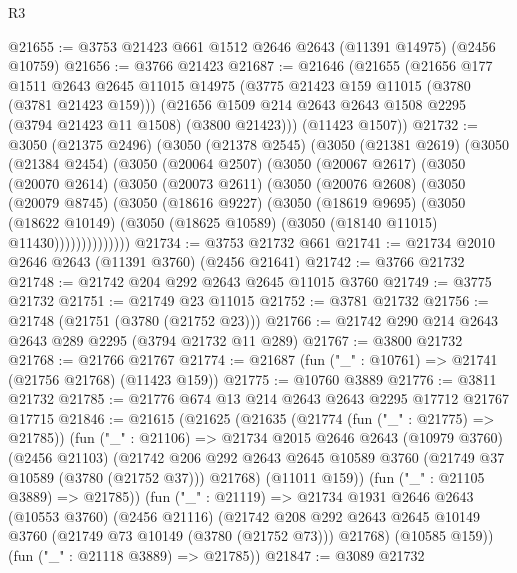 \begin{lexlean}{R3}
\begin{coremodule}
@21655 := @3753 @21423 @661 @1512 @2646 @2643 (@11391 @14975) (@2456 @10759)
@21656 := @3766 @21423
@21687 := @21646
    (@21655
      (@21656
        @177
        @1511
        @2643
        @2645
        @11015
        @14975
        (@3775 @21423 @159 @11015 (@3780 (@3781 @21423 @159)))
        (@21656 @1509 @214 @2643 @2643 @1508 @2295 (@3794 @21423 @11 @1508) (@3800 @21423)))
      (@11423 @1507))
@21732 := @3050
    (@21375 @2496)
    (@3050
      (@21378 @2545)
      (@3050
        (@21381 @2619)
        (@3050
          (@21384 @2454)
          (@3050
            (@20064 @2507)
            (@3050
              (@20067 @2617)
              (@3050
                (@20070 @2614)
                (@3050
                  (@20073 @2611)
                  (@3050
                    (@20076 @2608)
                    (@3050
                      (@20079 @8745)
                      (@3050
                        (@18616 @9227)
                        (@3050
                          (@18619 @9695)
                          (@3050
                            (@18622 @10149)
                            (@3050 (@18625 @10589) (@3050 (@18140 @11015) @11430))))))))))))))
@21734 := @3753 @21732 @661
@21741 := @21734 @2010 @2646 @2643 (@11391 @3760) (@2456 @21641)
@21742 := @3766 @21732
@21748 := @21742 @204 @292 @2643 @2645 @11015 @3760
@21749 := @3775 @21732
@21751 := @21749 @23 @11015
@21752 := @3781 @21732
@21756 := @21748 (@21751 (@3780 (@21752 @23)))
@21766 := @21742 @290 @214 @2643 @2643 @289 @2295 (@3794 @21732 @11 @289)
@21767 := @3800 @21732
@21768 := @21766 @21767
@21774 := @21687 (fun ("_" : @10761) => @21741 (@21756 @21768) (@11423 @159))
@21775 := @10760 @3889
@21776 := @3811 @21732
@21785 := @21776 @674 @13 @214 @2643 @2643 @2295 @17712 @21767 @17715
@21846 := @21615
    (@21625
      (@21635
        (@21774 (fun ("_" : @21775) => @21785))
        (fun ("_" : @21106) =>
        @21734
          @2015
          @2646
          @2643
          (@10979 @3760)
          (@2456 @21103)
          (@21742
            @206
            @292
            @2643
            @2645
            @10589
            @3760
            (@21749 @37 @10589 (@3780 (@21752 @37)))
            @21768)
          (@11011 @159))
        (fun ("_" : @21105 @3889) => @21785))
      (fun ("_" : @21119) =>
      @21734
        @1931
        @2646
        @2643
        (@10553 @3760)
        (@2456 @21116)
        (@21742 @208 @292 @2643 @2645 @10149 @3760 (@21749 @73 @10149 (@3780 (@21752 @73))) @21768)
        (@10585 @159))
      (fun ("_" : @21118 @3889) => @21785))
@21847 := @3089 @21732

\end{coremodule}
\end{lexlean}
